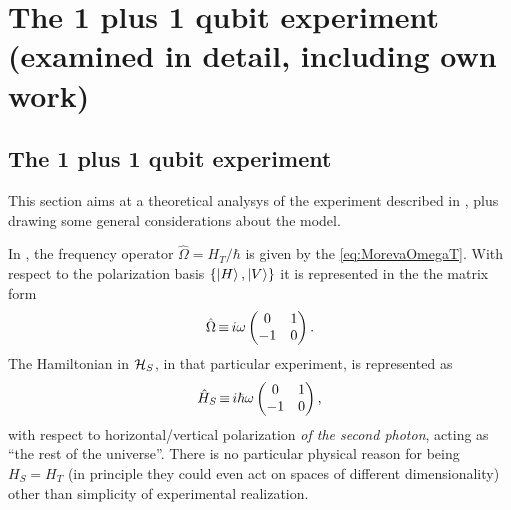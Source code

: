 \section{The 1 plus 1 qubit experiment (examined in detail, including own work)}

\subsection{The 1 plus 1 qubit experiment}
\label{1qubitExp}

This section aims at a theoretical analysys of the experiment
described in \cite{Moreva:synthetic, Moreva:illustration},
plus drawing some general considerations about the model. 

In \cite{Moreva:illustration}, the frequency operator $\hat{\Omega} = H_T / \hbar$
is given by the \eqref{eq:MorevaOmegaT}. With respect to the polarization basis
$\qty{\ket{H}, \ket{V}}$ it is represented in the the matrix form
\begin{equation}
  \hat{\Omega} \operatorname*{\equiv} {
    i\omega
    \begin{pmatrix}
      0 & 1 \\
     -1 & 0
    \end{pmatrix}
  } \, \text{.}
\end{equation}
The Hamiltonian in $\mathcal{H}_S$, in that particular experiment, is represented as
\begin{equation}\label{eq:H_S}
  \hat{H}_S \operatorname*{\equiv} {
    i\hbar\omega
    \begin{pmatrix}
      0 & 1 \\
     -1 & 0
    \end{pmatrix}
  } \, \text{,}
\end{equation}
with respect to horizontal/vertical polarization \emph{of the second photon},
acting as ``the rest of the universe''.
There is no particular physical reason for being $H_S = H_T$
(in principle they could even act on spaces of different dimensionality)
other than simplicity of experimental realization.

